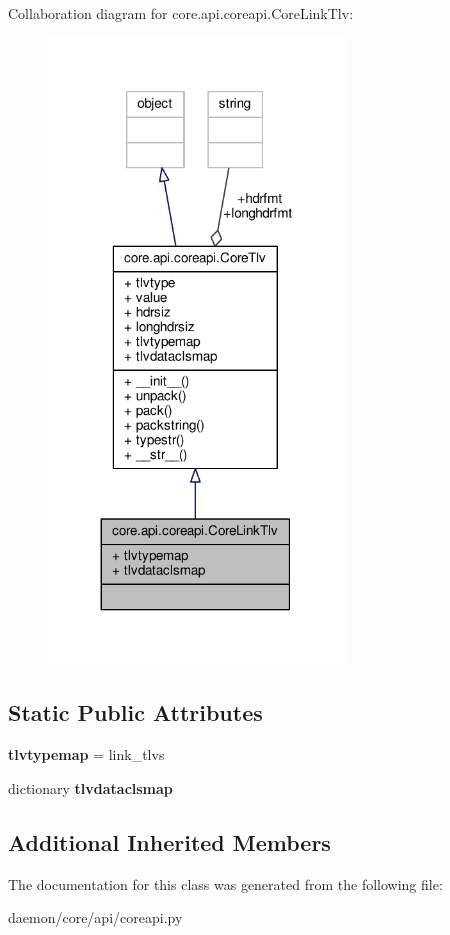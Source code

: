 Collaboration diagram for core.\+api.\+coreapi.\+Core\+Link\+Tlv\+:
\nopagebreak
\begin{figure}[H]
\begin{center}
\leavevmode
\includegraphics[width=224pt]{classcore_1_1api_1_1coreapi_1_1_core_link_tlv__coll__graph}
\end{center}
\end{figure}
\subsection*{Static Public Attributes}
\begin{DoxyCompactItemize}
\item 
\hypertarget{classcore_1_1api_1_1coreapi_1_1_core_link_tlv_a9065f40bcd6ccbf93499c8ac78f36d99}{{\bfseries tlvtypemap} = link\+\_\+tlvs}\label{classcore_1_1api_1_1coreapi_1_1_core_link_tlv_a9065f40bcd6ccbf93499c8ac78f36d99}

\item 
\hypertarget{classcore_1_1api_1_1coreapi_1_1_core_link_tlv_a6793572f8fde933010e9170272370838}{dictionary {\bfseries tlvdataclsmap}}\label{classcore_1_1api_1_1coreapi_1_1_core_link_tlv_a6793572f8fde933010e9170272370838}

\end{DoxyCompactItemize}
\subsection*{Additional Inherited Members}


The documentation for this class was generated from the following file\+:\begin{DoxyCompactItemize}
\item 
daemon/core/api/coreapi.\+py\end{DoxyCompactItemize}
